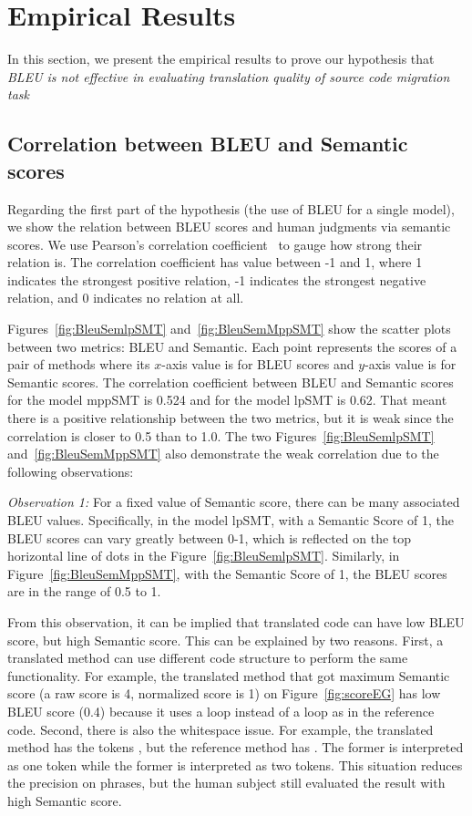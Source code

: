 \section{Empirical Results}
\label{sec:bleuresult}

In this section, we present the empirical results to prove our hypothesis that \textit{BLEU is not effective in evaluating translation quality of source code migration task}
\subsection{Correlation between BLEU and Semantic scores}
Regarding the first part of the hypothesis (the use of BLEU for a single model), we show the relation
between BLEU scores and human judgments via semantic scores. We use
Pearson's correlation coefficient~\cite{PearsonCorrelation} to gauge
how strong their relation is. The correlation coefficient has value
between -1 and 1, where 1 indicates the strongest positive relation, -1
indicates the strongest negative relation, and 0 indicates no relation at
all.

Figures~\ref{fig:BleuSemlpSMT} and~\ref{fig:BleuSemMppSMT} show the
scatter plots between two metrics: BLEU and Semantic. Each point
represents the scores of a pair of methods where its $x$-axis value is
for BLEU scores and $y$-axis value is for Semantic scores. The
correlation coefficient between BLEU and Semantic scores for the model
mppSMT is 0.524 and for the model lpSMT is 0.62. That meant there is a
positive relationship between the two metrics, but it is weak
since the correlation is closer to 0.5 than to 1.0. The two
Figures~\ref{fig:BleuSemlpSMT} and~\ref{fig:BleuSemMppSMT} also
demonstrate the weak correlation due to the following observations:

\emph{Observation 1:} For a fixed value of Semantic score, there can
be many associated BLEU values. Specifically, in the model lpSMT, with
a Semantic Score of 1, the BLEU scores can vary greatly between 0-1,
which is reflected on the top horizontal line of dots in the
Figure~\ref{fig:BleuSemlpSMT}. Similarly, in
Figure~\ref{fig:BleuSemMppSMT}, with the Semantic Score of 1, the BLEU
scores are in the range of 0.5 to 1.

From this observation, it can be implied that translated code can have
low BLEU score, but high Semantic score. This can be explained by two
reasons. First, a translated method can use different code structure
to perform the same functionality. For example, the translated method
that got maximum Semantic score (a raw score is 4, normalized score is
1) on Figure~\ref{fig:scoreEG} has low BLEU score (0.4) because it
uses a  loop instead of a  loop as in the
reference code. Second, there is also the whitespace issue. For
example, the translated method has the tokens , but the
reference method has . The former is interpreted as one
token while the former is interpreted as two tokens. This situation
reduces the precision on phrases, but the human subject still
evaluated the result with high Semantic score.

